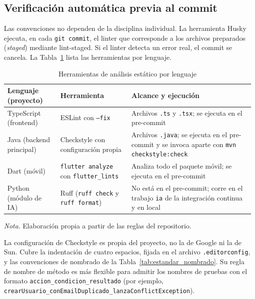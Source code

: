 \subsection{Verificación automática previa al commit}

Las convenciones no dependen de la disciplina individual. La herramienta Husky ejecuta, en cada \texttt{git commit}, el linter que corresponde a los archivos preparados (\textit{staged}) mediante lint-staged. Si el linter detecta un error real, el commit se cancela. La Tabla~\ref{tab:estandar_linters} lista las herramientas por lenguaje.

\begin{table}[H]
\caption{Herramientas de análisis estático por lenguaje}
\label{tab:estandar_linters}
\begin{threeparttable}
\begin{tabular}{>{\raggedright\arraybackslash}p{3.2cm} >{\raggedright\arraybackslash}p{3.6cm} >{\raggedright\arraybackslash}p{6.0cm}}
\toprule
Lenguaje (proyecto) & Herramienta & Alcance y ejecución \\
\midrule
TypeScript (frontend) & ESLint con \texttt{--fix} & Archivos \texttt{.ts} y \texttt{.tsx}; se ejecuta en el pre-commit \\
Java (backend principal) & Checkstyle con configuración propia & Archivos \texttt{.java}; se ejecuta en el pre-commit y se invoca aparte con \texttt{mvn checkstyle:check} \\
Dart (móvil) & \texttt{flutter analyze} con \texttt{flutter\_lints} & Analiza todo el paquete móvil; se ejecuta en el pre-commit \\
Python (módulo de IA) & Ruff (\texttt{ruff check} y \texttt{ruff format}) & No está en el pre-commit; corre en el trabajo \texttt{ia} de la integración continua y en local \\
\bottomrule
\end{tabular}
\begin{tablenotes}
\item \textit{Nota.} Elaboración propia a partir de las reglas del repositorio.
\end{tablenotes}
\end{threeparttable}
\end{table}

La configuración de Checkstyle es propia del proyecto, no la de Google ni la de Sun. Cubre la indentación de cuatro espacios, fijada en el archivo \texttt{.editorconfig}, y las convenciones de nombrado de la Tabla~\ref{tab:estandar_nombrado}. Su regla de nombre de método es más flexible para admitir los nombres de pruebas con el formato \texttt{accion\_condicion\_resultado} (por ejemplo, \texttt{crearUsuario\_conEmailDuplicado\_lanzaConflictException}).

